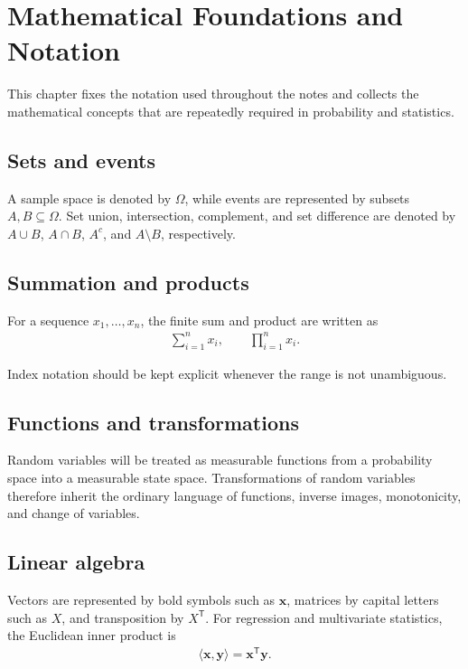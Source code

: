 \chapter{Mathematical Foundations and Notation}
\label{chap:foundations}

This chapter fixes the notation used throughout the notes and collects the mathematical concepts that are repeatedly required in probability and statistics.

\section{Sets and events}

A sample space is denoted by $\Omega$, while events are represented by subsets $A,B\subseteq\Omega$. Set union, intersection, complement, and set difference are denoted by $A\cup B$, $A\cap B$, $A^{c}$, and $A\setminus B$, respectively.

\section{Summation and products}

For a sequence $x_1,\ldots,x_n$, the finite sum and product are written as
\begin{align}
\sum_{i=1}^{n}x_i,
\qquad
\prod_{i=1}^{n}x_i.
\end{align}

Index notation should be kept explicit whenever the range is not unambiguous.

\section{Functions and transformations}

Random variables will be treated as measurable functions from a probability space into a measurable state space. Transformations of random variables therefore inherit the ordinary language of functions, inverse images, monotonicity, and change of variables.

\section{Linear algebra}

Vectors are represented by bold symbols such as $\bm{x}$, matrices by capital letters such as $X$, and transposition by $X^{\mathsf T}$. For regression and multivariate statistics, the Euclidean inner product is
\begin{align}
\langle \bm{x},\bm{y}\rangle = \bm{x}^{\mathsf T}\bm{y}.
\end{align}
